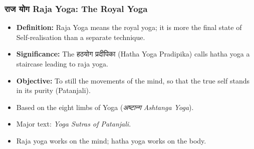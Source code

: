 \begin{frame}[fragile]\frametitle{राज  योग  Raja Yoga: The Royal Yoga}
    
      \begin{itemize}
	  \item \textbf{Definition:} Raja Yoga means the royal yoga; it is more the final state of Self-realisation than a separate technique.
	  \item  \textbf{Significance:} The हठयोग प्रदीपिका (Hatha Yoga Pradipika) calls hatha yoga a staircase leading to raja yoga.
	  \item \textbf{Objective:} To still the movements of the mind, so that the true self stands in its purity (Patanjali).
		\item Based on the eight limbs of Yoga (\textit{अष्टान्ग Ashtanga Yoga}).
		\item Major text: \textit{Yoga Sutras of Patanjali}.
		\item Raja yoga works on the mind; hatha yoga works on the body.
	  \end{itemize}
    
\end{frame}

